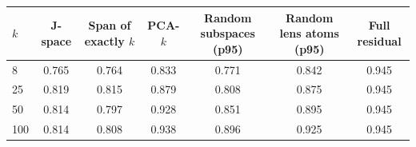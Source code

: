 \begin{tabular}{@{}lcccccc@{}}\toprule
$k$ & J-space & Span of exactly $k$ & PCA-$k$ & Random subspaces (p95) & Random lens atoms (p95) & Full residual\\\midrule
8 & 0.765 & 0.764 & 0.833 & 0.771 & 0.842 & 0.945\\
25 & 0.819 & 0.815 & 0.879 & 0.808 & 0.875 & 0.945\\
50 & 0.814 & 0.797 & 0.928 & 0.851 & 0.895 & 0.945\\
100 & 0.814 & 0.808 & 0.938 & 0.896 & 0.925 & 0.945\\
\bottomrule\end{tabular}
